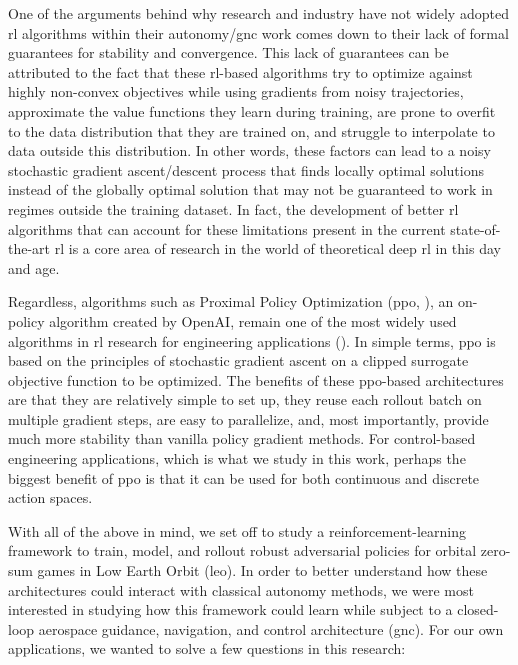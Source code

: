One of the arguments behind why research and industry have not widely adopted \acs{rl} algorithms within their autonomy/\acs{gnc} work comes down to their lack of formal guarantees for stability and convergence. This lack of guarantees can be attributed to the fact that these \acs{rl}-based algorithms try to optimize against highly non-convex objectives while using gradients from noisy trajectories, approximate the value functions they learn during training, are prone to overfit to the data distribution that they are trained on, and struggle to interpolate to data outside this distribution. In other words, these factors can lead to a noisy stochastic gradient ascent/descent process that finds locally optimal solutions instead of the globally optimal solution that may not be guaranteed to work in regimes outside the training dataset. In fact, the development of better \acs{rl} algorithms that can account for these limitations present in the current state-of-the-art \acs{rl} is a core area of research in the world of theoretical deep \acs{rl} in this day and age. 

Regardless, algorithms such as Proximal Policy Optimization (\acs{ppo}, \cite{schulman2017ppo}), an on-policy algorithm created by OpenAI, remain one of the most widely used algorithms in \acs{rl} research for engineering applications (\cite{francois2018introduction}). In simple terms, \acs{ppo} is based on the principles of stochastic gradient ascent on a clipped surrogate objective function to be optimized. The benefits of these \acs{ppo}-based architectures are that they are relatively simple to set up, they reuse each rollout batch on multiple gradient steps, are easy to parallelize, and, most importantly, provide much more stability than vanilla policy gradient methods. For control-based engineering applications, which is what we study in this work, perhaps the biggest benefit of \acs{ppo} is that it can be used for both continuous and discrete action spaces.



With all of the above in mind, we set off to study a reinforcement-learning framework to train, model, and rollout robust adversarial policies for orbital zero-sum games in Low Earth Orbit (\acs{leo}). In order to better understand how these architectures could interact with classical autonomy methods, we were most interested in studying how this framework could learn while subject to a closed-loop aerospace guidance, navigation, and control architecture (\acs{gnc}). For our own applications, we wanted to solve a few questions in this research:

